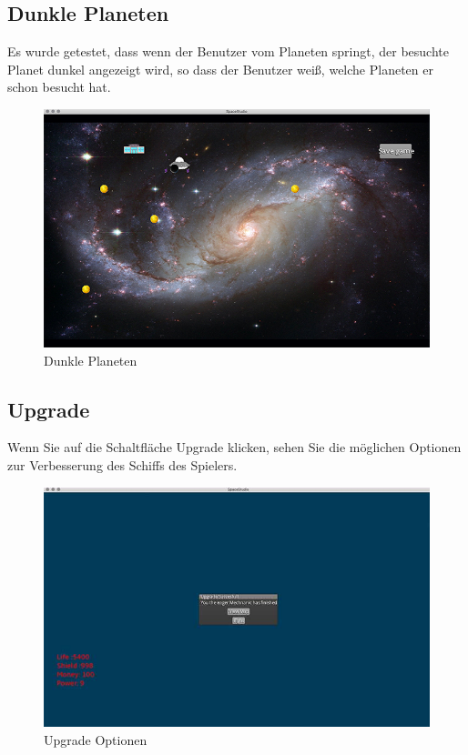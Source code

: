 \documentclass[12pt]{article}
\begin{document}
\subsection{Dunkle Planeten}
Es wurde getestet, dass wenn der Benutzer vom Planeten springt, der besuchte Planet dunkel angezeigt wird, so dass der Benutzer weiß, welche Planeten er schon besucht hat.
\begin{figure}[htp]
\centering
\includegraphics[scale=0.6]{TestProtocolBilder/besuchtePlanet.jpg}
\caption{Dunkle Planeten}
\end{figure}
\newpage
\subsection{Upgrade}
Wenn Sie auf die Schaltfläche Upgrade klicken, sehen Sie die möglichen Optionen zur Verbesserung des Schiffs des Spielers.
\begin{figure}[htp]
\centering
\includegraphics[scale=0.6]{TestProtocolBilder/nachupgrade@0,25x.jpg}
\caption{Upgrade Optionen}
\end{figure}
\end{document}
